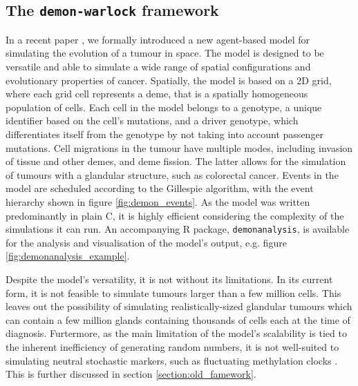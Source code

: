 \subsection{The \texttt{demon-warlock} framework}
In a recent paper \cite{bak_warlock_2023}, we formally introduced a new agent-based model for simulating the
evolution of a tumour in space. The model is designed to be versatile and able to simulate a wide range of
spatial configurations and evolutionary properties of cancer. Spatially, the model is based on a 2D grid, where
each grid cell represents a deme, that is a spatially homogeneous population of cells. Each cell in the model
belongs to a genotype, a unique identifier based on the cell's mutations, and a driver genotype, which differentiates
itself from the genotype by not taking into account passenger mutations. Cell migrations in the tumour have multiple
modes, including invasion of tissue and other demes, and deme fission. The latter allows for the simulation of
tumours with a glandular structure, such as colorectal cancer. Events in the model are scheduled according to the
Gillespie algorithm, with the event hierarchy shown in figure \ref{fig:demon_events}. As the model was written
predominantly in plain C, it is highly efficient considering the complexity of the simulations it can run. An
accompanying R package, \texttt{demonanalysis}, is available for the analysis and visualisation of the model's
output, e.g. figure \ref{fig:demonanalysis_example}. \par
Despite the model's versatility, it is not without its limitations. In its current form, it is not feasible to
simulate tumours larger than a few million cells. This leaves out the possibility of simulating realistically-sized
glandular tumours which can contain a few million glands containing thousands of cells each at the time of diagnosis.
Furtermore, as the main limitation of the model's scalability is tied to the inherent inefficiency of generating
random numbers, it is not well-suited to simulating neutral stochastic markers, such as fluctuating methylation
clocks \cite{gabbutt_fluctuating_2022}. This is further discussed in section \ref{section:old_famework}.


